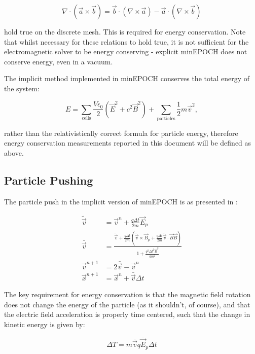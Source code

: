 \documentclass{article}
\begin{document}
\begin{equation}
  \nabla \cdot \left(\vec{a} \times \vec{b}\right) = \vec{b}\cdot \left(\nabla \times \vec{a}\right) - \vec{a}\cdot\left(\nabla\times\vec{b}\right)
\end{equation}

hold true on the discrete mesh. This is required for energy conservation. Note that whilst necessary for these relations to hold true, it is not sufficient for the electromagnetic solver to be energy conserving - explicit minEPOCH does not conserve energy, even in a vacuum.

The implicit method implemented in minEPOCH conserves the total energy of the system:

\begin{equation}
  E = \sum_{\mathrm{cells}} \frac{V\epsilon_0}{2} \left(\vec{E}^2 + c^2 \vec{B}^2\right) + \sum_{\mathrm{particles}} \frac{1}{2}m\vec{v}^2,
\end{equation}

rather than the relativistically correct formula for particle energy, therefore energy conservation measurements reported in this document will be defined as above.

\subsection{Particle Pushing}

The particle push in the implicit version of minEPOCH is as presented in \cite{markidis}:

\begin{align}
  \tilde{\vec{v}} &= \vec{v}^n + \frac{q \Delta t}{2 m}\vec{E}_p \\
  \bar{\vec{v}} &= \frac{\tilde{\vec{v}} + \frac{q \Delta t}{2 m}\left(\tilde{\vec{v}} \times \vec{B}_p + \frac{q \Delta t}{2 m}\tilde{\vec{v}} \cdot \vec{B}\vec{B}\right)}{1 + \frac{q^2\Delta t^2 \vec{B}^2}{4m^2}}\\
  \vec{v}^{n+1} &= 2 \bar{\vec{v}} - \vec{v}^n \\
  \vec{x}^{n+1} &= \vec{x}^n  + \bar{\vec{v}} \Delta t
\end{align}

The key requirement for energy conservation is that the magnetic field rotation does not change the energy of the particle (as it shouldn't, of course), and that the electric field acceleration is properly time centered, such that the change in kinetic energy is given by:

\begin{equation}
  \Delta T = m \bar{\vec{v}} q \bar{\vec{E}}_p \Delta t
\end{equation}
\end{document}
